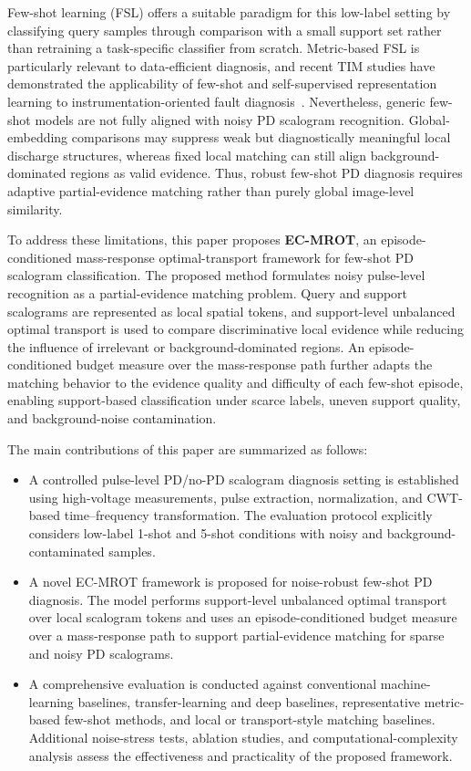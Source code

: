 \documentclass[journal]{IEEEtran}
\newcommand{\method}{EC-MROT}
\newcommand{\1}{\mathbf{1}}
\begin{document}
Few-shot learning (FSL) offers a suitable paradigm for this low-label setting by classifying query samples through comparison with a small support set rather than retraining a task-specific classifier from scratch. Metric-based FSL is particularly relevant to data-efficient diagnosis, and recent TIM studies have demonstrated the applicability of few-shot and self-supervised representation learning to instrumentation-oriented fault diagnosis~\cite{Wang2024TIMSSLFewShot,Vu2024TIMFewShotBearing}. Nevertheless, generic few-shot models are not fully aligned with noisy PD scalogram recognition. Global-embedding comparisons may suppress weak but diagnostically meaningful local discharge structures, whereas fixed local matching can still align background-dominated regions as valid evidence. Thus, robust few-shot PD diagnosis requires adaptive partial-evidence matching rather than purely global image-level similarity.

To address these limitations, this paper proposes \textbf{\method{}}, an episode-conditioned mass-response optimal-transport framework for few-shot PD scalogram classification. The proposed method formulates noisy pulse-level recognition as a partial-evidence matching problem. Query and support scalograms are represented as local spatial tokens, and support-level unbalanced optimal transport is used to compare discriminative local evidence while reducing the influence of irrelevant or background-dominated regions. An episode-conditioned budget measure over the mass-response path further adapts the matching behavior to the evidence quality and difficulty of each few-shot episode, enabling support-based classification under scarce labels, uneven support quality, and background-noise contamination.

The main contributions of this paper are summarized as follows:
\begin{itemize}
    \item A controlled pulse-level PD/no-PD scalogram diagnosis setting is established using high-voltage measurements, pulse extraction, normalization, and CWT-based time--frequency transformation. The evaluation protocol explicitly considers low-label 1-shot and 5-shot conditions with noisy and background-contaminated samples.

    \item A novel \method{} framework is proposed for noise-robust few-shot PD diagnosis. The model performs support-level unbalanced optimal transport over local scalogram tokens and uses an episode-conditioned budget measure over a mass-response path to support partial-evidence matching for sparse and noisy PD scalograms.

    \item A comprehensive evaluation is conducted against conventional machine-learning baselines, transfer-learning and deep baselines, representative metric-based few-shot methods, and local or transport-style matching baselines. Additional noise-stress tests, ablation studies, and computational-complexity analysis assess the effectiveness and practicality of the proposed framework.
\end{itemize}
\end{document}
